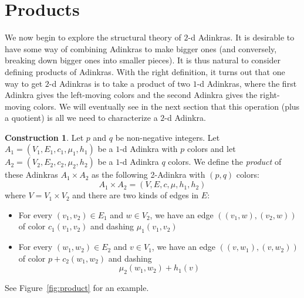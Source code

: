 \documentclass[12pt,twoside,singlespace]{article}
\numberwithin{equation}{section}
\theoremstyle{definition}
\newtheorem{construction}[equation]{Construction}
\begin{document}
\section{Products}
\label{sec:products}

We now begin to explore the structural theory of $2$-d Adinkras. It is desirable to have some way of combining Adinkras to make bigger ones (and conversely, breaking down bigger ones into smaller pieces). It is thus natural to consider defining products of Adinkras. With the right definition, it turns out that one way to get $2$-d Adinkras is to take a product of two $1$-d Adinkras, where the first Adinkra gives the left-moving colors and the second Adinkra gives the right-moving colors. We will eventually see in the next section that this operation (plus a quotient) is all we need to characterize a $2$-d Adinkra.

\begin{construction}
\label{const:product}
Let $p$ and $q$ be non-negative integers.  Let $A_1=(V_1, E_1, c_1, \mu_1,h_1)$ be a $1$-d Adinkra with $p$ colors and let $A_2=(V_2, E_2, c_2, \mu_2,h_2)$ be a $1$-d Adinkra $q$ colors.  We define the \emph{product} of these Adinkras $A_1\times A_2$ as the following 2-Adinkra with $(p,q)$ colors:
\[A_1\times A_2=(V,E,c,\mu,h_1,h_2)\]
where $V=V_1\times V_2$ and there are two kinds of edges in $E$:
\begin{itemize}
\item For every $(v_1,v_2)\in E_1$ and $w\in V_2$, we have an edge $((v_1,w),(v_2,w))$ of color $c_1(v_1,v_2)$ and dashing $\mu_1(v_1,v_2)$
\item For every $(w_1,w_2)\in E_2$ and $v\in V_1$, we have an edge $((v,w_1),(v,w_2))$ of color $p+c_2(w_1,w_2)$ and dashing
\begin{equation}
\label{eqn:dashprodshift}
\mu_2(w_1,w_2)+h_1(v)
\end{equation}
\end{itemize}
 See Figure~\ref{fig:product} for an example.
\end{construction}
\end{document}
